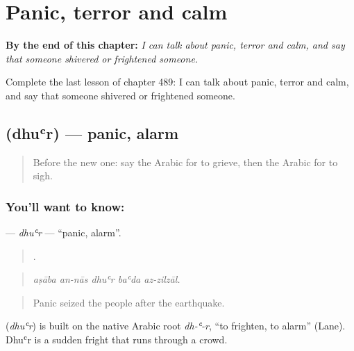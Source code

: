 
\chapter{Panic, terror and calm}
\label{ch:ar-panic-terror-and-calm}

\begin{chapteropening}
\textbf{By the end of this chapter:} \emph{I can talk about panic, terror and calm, and say that someone shivered or frightened someone.}

Complete the last lesson of chapter 489: I can talk about panic, terror and calm, and say that someone shivered or frightened someone.
\end{chapteropening}

\section[\texorpdfstring{\ar{ذعر} (dhuʿr)}{ذعر (dhuʿr)}]{ (dhuʿr) — panic, alarm}

\label{lesson:AR-C489-dhur}



\begin{quote}
Before the new one: say the Arabic for to grieve, then the Arabic for to sigh.
\end{quote}

\subsection*{You'll want to know: }
\textbf{} — \emph{dhuʿr} — \textquotedblleft{}panic, alarm\textquotedblright{}.

\begin{quote}
    .
\end{quote}

\begin{quote}
\emph{aṣāba an-nās dhuʿr baʿda az-zilzāl.}
\end{quote}

\begin{quote}
Panic seized the people after the earthquake.
\end{quote}

\begin{cousinweb}
\textbf{} (\emph{dhuʿr}) is built on the native Arabic root \emph{dh-ʿ-r}, \textquotedblleft{}to frighten, to alarm\textquotedblright{} (Lane). Dhuʿr is a sudden fright that runs through a crowd.
\end{cousinweb}

